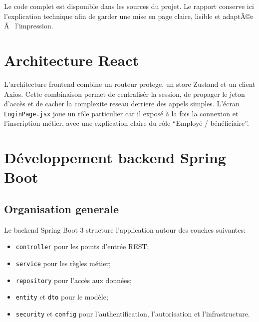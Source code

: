 ﻿\documentclass[12pt,a4paper,oneside]{report}
\newenvironment{codeblock}[1][]{
  \par
  \captionsetup{type=figure}
}{
  \par
}
\begin{document}
\begin{codeblock}[H]
\caption{Implémentation de la page Dashboard en React}
\begin{keybox}
Le code complet est disponible dans les sources du projet. Le rapport conserve ici l'explication technique afin de garder une mise en page claire, lisible et adaptÃ©e Ã  l'impression.
\end{keybox}
\end{codeblock}

\section{Architecture React}
L'architecture frontend combine un routeur protege, un store Zustand et un client Axios. Cette combinaison permet de centralisér la session, de propager le jeton d'accès et de cacher la complexite reseau derriere des appels simples. L'écran \texttt{LoginPage.jsx} joue un rôle particulier car il exposé à la fois la connexion et l'inscription métier, avec une explication claire du rôle \enquote{Employé / bénéficiaire}.

\section{Développement backend Spring Boot}
\subsection{Organisation generale}
Le backend Spring Boot 3 structure l'application autour des couches suivantes:
\begin{itemize}
  \item \texttt{controller} pour les points d'entrée REST;
  \item \texttt{service} pour les règles métier;
  \item \texttt{repository} pour l'accès aux données;
  \item \texttt{entity} et \texttt{dto} pour le modèle;
  \item \texttt{security} et \texttt{config} pour l'authentification, l'autorisation et l'infrastructure.
\end{itemize}
\end{document}
